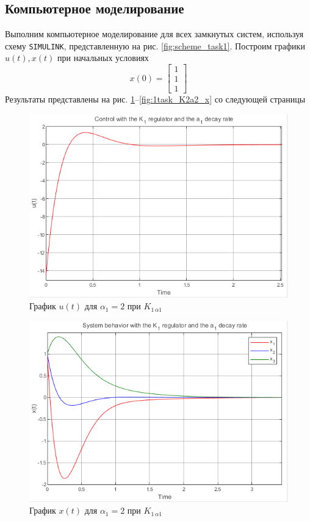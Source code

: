 \documentclass[a4paper, 12pt]{article}
\begin{document}
    \subsection{Компьютерное моделирование}
    Выполним компьютерное моделирование для всех замкнутых систем, используя схему \texttt{SIMULINK},
    представленную на рис. \ref{fig:scheme_task1}. Построим графики $u(t),x(t)$ при начальных условиях
    $$x(0)=\begin{bmatrix}
        1 \\1 \\1
    \end{bmatrix}$$
    Результаты представлены на рис. \ref{fig:1task_K1a1_u}--\ref{fig:1task_K2a2_x} со следующей страницы
    \newpage
    \vspace*{0.01mm}
    \begin{figure}[H]
        \centering
        \includegraphics{1task_K1a1_u.png}
        \captionsetup{skip=0pt}
        \caption{График $u(t)$ для $\alpha_1=2$ при $K_{1\,\alpha1}$}
        \label{fig:1task_K1a1_u}
    \end{figure}
    \begin{figure}[H]
        \centering
        \includegraphics{1task_K1a1_x.png}
        \captionsetup{skip=0pt}
        \caption{График $x(t)$ для $\alpha_1=2$ при $K_{1\,\alpha1}$}
        \label{fig:1task_K1a1_x}
    \end{figure}
\end{document}
